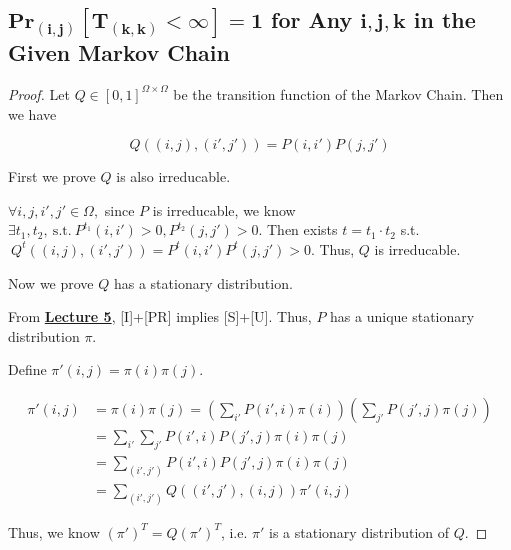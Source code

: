 \documentclass{article}
\renewcommand{\Pr}[2]{\mathbf{Pr}_{#1}\left[#2\right]}
\begin{document}
\subsection{$\boldsymbol{\Pr{(i,j)}{T_{(k,k)}<\infty}=1}$ for Any $\boldsymbol{i,j,k}$ in the Given Markov Chain}
\vspace{1em}
\begin{proof}
    Let $Q\in[0,1]^{\Omega\times\Omega}$ be the transition function of the Markov Chain. Then we have
    
    \vspace{-1.5em}
    $$Q\left((i,j),(i',j')\right)=P(i,i')P(j,j')$$
    
    \vspace{-0.5em} \hspace{1.3em}
    First we prove $Q$ is also irreducable.
    
    \hspace{1.3em}
    $\forall i,j,i',j'\in\Omega,$ since $P$ is irreducable, we know $\exists t_1, t_2,\ \mathrm{s.t.}\ P^{t_1}(i,i')>0, P^{t_2}(j,j')>0.$ Then exists $t=t_1\cdot t_2$ s.t. $\ Q^{t}\left((i,j),(i',j')\right)=P^{t}(i,i')P^{t}(j,j')>0.$ Thus, $Q$ is irreducable.
    
    \vspace{1em} \hspace{1.3em}
    Now we prove $Q$ has a stationary distribution.
    
    \hspace{1.3em}
    From \underline{\textbf{Lecture 5}}, [I]+[PR] implies [S]+[U]. Thus, $P$ has a unique stationary distribution $\pi$. 
    
    \hspace{1.3em}
    Define $\pi'(i,j) = \pi(i)\pi(j).$
    
    \vspace{-3em}
    \begin{align*}
        \pi'(i,j) &= \pi(i)\pi(j) = \left(\sum_{i'}P(i',i)\pi(i)\right)\left(\sum_{j'}P(j',j)\pi(j)\right) \\
       & = \sum_{i'}\sum_{j'}P(i',i)P(j',j)\pi(i)\pi(j) \\
       & = \sum_{(i',j')}P(i',i)P(j',j)\pi(i)\pi(j) \\
       & = \sum_{(i',j')}Q((i',j'),(i,j))\pi'(i,j) 
    \end{align*}
    
    \vspace{-0.5em} \hspace{1.3em}
    Thus, we know $(\pi')^T = Q(\pi')^T$, i.e. $\pi'$ is a stationary distribution of $Q.$
    

\end{proof}
\end{document}
